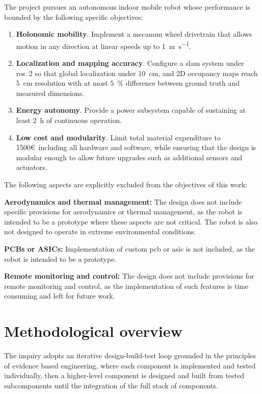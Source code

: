 The project pursues an autonomous indoor mobile robot whose performance is bounded by the following specific objectives:

\begin{enumerate}
  \item \textbf{Holonomic mobility}. 
        Implement a mecanum wheel drivetrain that allows motion in any direction at linear speeds up to \SI[per-mode=fraction,fraction-function=\tfrac]{1}{\metre\per\second}.

  \item \textbf{Localization and mapping accuracy}. 
        Configure a \gls{slam} system under \gls{ros}~2 so that global localization under \SI{10}{\centi\metre}, and 2D occupancy maps reach \SI{5}{\centi\metre} resolution with at most \SI{5}{\percent} difference between ground truth and measured dimensions.

  \item \textbf{Energy autonomy}. 
        Provide a power subsystem capable of sustaining at least \SI{2}{\hour} of continuous operation.

  \item \textbf{Low cost and modularity}. 
        Limit total material expenditure to 1500\euro~including all hardware and software, while ensuring that the design is modular enough to allow future upgrades such as additional sensors and actuators.
\end{enumerate}

The following aspects are explicitly excluded from the objectives of this work:

\textbf{Aerodynamics and thermal management:} The design does not include specific provisions for aerodynamics or thermal management, as the robot is intended to be a prototype where these aspects are not critical. The robot is also not designed to operate in extreme environmental conditions.

\textbf{PCBs or ASICs:} Implementation of custom \gls{pcb} or \gls{asic} is not included, as the robot is intended to be a prototype.

\textbf{Remote monitoring and control:} The design does not include provisions for remote monitoring and control, as the implementation of such features is time consuming and left for future work.

\section{Methodological overview}
The inquiry adopts an iterative design-build-test loop grounded in the principles of evidence based engineering, where each component is implemented and tested individually, then a higher-level component is designed and built from tested subcomponents until the integration of the full stack of components.

